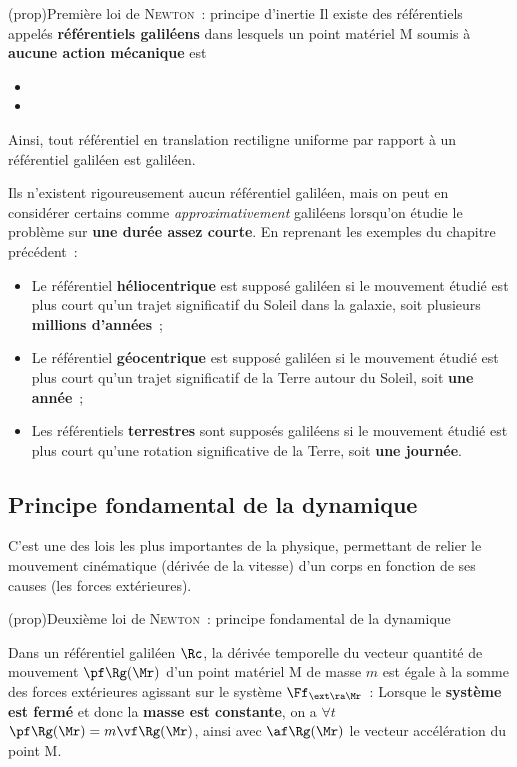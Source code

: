 \documentclass[../../main/main.tex]{subfiles}
\begin{document}
\begin{tcb*}(prop){Première loi de \textsc{Newton}~: principe d'inertie}
	Il existe des référentiels appelés \textbf{référentiels galiléens} dans
	lesquels un point matériel M soumis à \textbf{aucune action mécanique} est
	\begin{itemize}
		\item {}
		\item {}
	\end{itemize}
	Ainsi, tout référentiel en translation rectiligne uniforme par rapport à un
	référentiel galiléen est galiléen.
\end{tcb*}

Ils n'existent rigoureusement aucun référentiel galiléen, mais on peut en
considérer certains comme \textit{approximativement} galiléens lorsqu'on étudie
le problème sur \textbf{une durée assez courte}. En reprenant les exemples du
chapitre précédent~:
\begin{itemize}
	\item Le référentiel \textbf{héliocentrique} est supposé galiléen si le
	      mouvement étudié est plus court qu'un trajet significatif du Soleil dans
	      la galaxie, soit plusieurs \textbf{millions d'années}~;
	\item Le référentiel \textbf{géocentrique} est supposé galiléen si le
	      mouvement étudié est plus court qu'un trajet significatif de la Terre
	      autour du Soleil, soit \textbf{une année}~;
	\item Les référentiels \textbf{terrestres} sont supposés galiléens si le
	      mouvement étudié est plus court qu'une rotation significative de la
	      Terre, soit \textbf{une journée}.
\end{itemize}

\subsection{Principe fondamental de la dynamique}

C'est une des lois les plus importantes de la physique, permettant de relier le
mouvement cinématique (dérivée de la vitesse) d'un corps en fonction de ses
causes (les forces extérieures).

\begin{tcb*}(prop){Deuxième loi de \textsc{Newton}~: principe fondamental de la
			dynamique}

	Dans un référentiel galiléen $\Rc$, la dérivée temporelle du vecteur
	quantité de mouvement $\pf\Rg(\Mr)$ d'un point matériel M de masse $m$ est
	égale à la somme des forces extérieures agissant sur le système
	$\Ff_{\ext\ra\Mr}$~:
	\psw{
		\[
			\boxed{\dv{\pf\Rg(\Mr)}{t} = \sum \Ff_{\ext\ra\Mr}}
		\]
	}
	Lorsque le \textbf{système est fermé} et donc la \textbf{masse est constante},
	on a $\forall t$ $\pf\Rg(\Mr) = m\vf\Rg(\Mr)$, ainsi
	\psw{
		\[
			\boxed{m\af\Rg(\Mr) = \sum \Ff_{\ext\ra\Mr}}
		\]
	}
	avec $\af\Rg(\Mr)$ le vecteur accélération du point M.
\end{tcb*}
\end{document}
